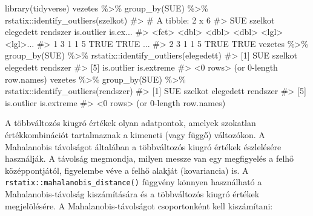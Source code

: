 \documentclass[
  letterpaper,
]{krantz}
\makeatletter
\newenvironment{Shaded}{\begin{snugshade}}{\end{snugshade}}
\newcommand{\CommentTok}[1]{\textcolor[rgb]{0.37,0.37,0.37}{#1}}
\newcommand{\FunctionTok}[1]{\textcolor[rgb]{0.28,0.35,0.67}{#1}}
\newcommand{\NormalTok}[1]{\textcolor[rgb]{0.00,0.23,0.31}{#1}}
\newcommand{\SpecialCharTok}[1]{\textcolor[rgb]{0.37,0.37,0.37}{#1}}
\newenvironment{kframe}{%
\medskip{}
\setlength{\fboxsep}{.8em}
 \def\at@end@of@kframe{}%
 \ifinner\ifhmode%
  \def\at@end@of@kframe{\end{minipage}}%
  \begin{minipage}{\columnwidth}%
 \fi\fi%
 \def\FrameCommand##1{\hskip\@totalleftmargin \hskip-\fboxsep
 \colorbox{shadecolor}{##1}\hskip-\fboxsep
     \hskip-\linewidth \hskip-\@totalleftmargin \hskip\columnwidth}%
 \MakeFramed {\advance\hsize-\width
   \@totalleftmargin\z@ \linewidth\hsize
   \@setminipage}}%
 {\par\unskip\endMakeFramed%
 \at@end@of@kframe}
\renewenvironment{Shaded}{\begin{kframe}}{\end{kframe}}
\makeatother
\begin{document}
\begin{Shaded}
\begin{Highlighting}[]
\FunctionTok{library}\NormalTok{(tidyverse)}
\NormalTok{vezetes }\SpecialCharTok{\%\textgreater{}\%}
    \FunctionTok{group\_by}\NormalTok{(SUE) }\SpecialCharTok{\%\textgreater{}\%}
\NormalTok{    rstatix}\SpecialCharTok{::}\FunctionTok{identify\_outliers}\NormalTok{(szelkot)}
\CommentTok{\#\textgreater{} \# A tibble: 2 x 6}
\CommentTok{\#\textgreater{}   SUE   szelkot elegedett rendszer is.outlier is.ex...}
\CommentTok{\#\textgreater{}   \textless{}fct\textgreater{}   \textless{}dbl\textgreater{}     \textless{}dbl\textgreater{}    \textless{}dbl\textgreater{} \textless{}lgl\textgreater{}      \textless{}lgl\textgreater{}...}
\CommentTok{\#\textgreater{} 1 3           1         1        5 TRUE       TRUE ...}
\CommentTok{\#\textgreater{} 2 3           1         1        5 TRUE       TRUE}
\NormalTok{vezetes }\SpecialCharTok{\%\textgreater{}\%}
    \FunctionTok{group\_by}\NormalTok{(SUE) }\SpecialCharTok{\%\textgreater{}\%}
\NormalTok{    rstatix}\SpecialCharTok{::}\FunctionTok{identify\_outliers}\NormalTok{(elegedett)}
\CommentTok{\#\textgreater{} [1] SUE        szelkot    elegedett  rendszer  }
\CommentTok{\#\textgreater{} [5] is.outlier is.extreme}
\CommentTok{\#\textgreater{} \textless{}0 rows\textgreater{} (or 0{-}length row.names)}
\NormalTok{vezetes }\SpecialCharTok{\%\textgreater{}\%}
    \FunctionTok{group\_by}\NormalTok{(SUE) }\SpecialCharTok{\%\textgreater{}\%}
\NormalTok{    rstatix}\SpecialCharTok{::}\FunctionTok{identify\_outliers}\NormalTok{(rendszer)}
\CommentTok{\#\textgreater{} [1] SUE        szelkot    elegedett  rendszer  }
\CommentTok{\#\textgreater{} [5] is.outlier is.extreme}
\CommentTok{\#\textgreater{} \textless{}0 rows\textgreater{} (or 0{-}length row.names)}
\end{Highlighting}
\end{Shaded}

A többváltozós kiugró értékek olyan adatpontok, amelyek szokatlan
értékkombinációt tartalmaznak a kimeneti (vagy függő) változókon. A
Mahalanobis távolságot általában a többváltozós kiugró értékek
észlelésére használják. A távolság megmondja, milyen messze van egy
megfigyelés a felhő középpontjától, figyelembe véve a felhő alakját
(kovariancia) is. A \texttt{rstatix::mahalanobis\_distance()} függvény
könnyen használható a Mahalanobis-távolság kiszámítására és a
többváltozós kiugró értékek megjelölésére. A Mahalanobis-távolságot
csoportonként kell kiszámítani:
\end{document}
